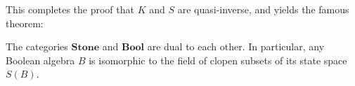 This completes the proof that $K$ and $S$ are quasi-inverse, and
yields the famous theorem:

\begin{box-thm} The categories $\mathbf{Stone}$
  and $\mathbf{Bool}$ are dual to each other.  In particular, any
  Boolean algebra $B$ is isomorphic to the field of clopen subsets of
  its state space $S(B)$.  \end{box-thm}














